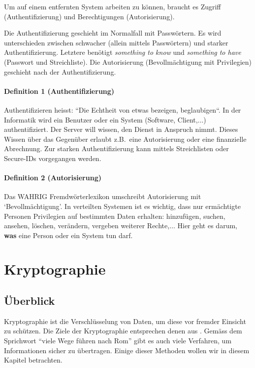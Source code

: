 Um auf einem entfernten System arbeiten zu können, braucht es Zugriff
(Authentifizierung) und Berechtigungen (Autorisierung).

Die Authentifizierung geschieht im Normalfall mit Passwörtern. Es wird
unterschieden zwischen schwacher (allein mittels Passwörtern) und
starker Authentifizierung. Letztere benötigt \emph{something to know}
und \emph{something to have} (Passwort und Streichliste). Die Autorisierung
(Bevollmächtigung mit Privilegien) geschieht nach der Authentifizierung.

\paragraph*{Definition 1 (Authentifizierung)}
Authentifizieren heisst: ``Die Echtheit von etwas bezeigen, beglaubigen``\cite{wahrig}.
In der Informatik wird ein Benutzer oder ein System (Software, Client,$\ldots$)
authentifiziert. Der Server will wissen, den Dienst in Anspruch nimmt. Dieses
Wissen über das Gegenüber erlaubt z.B.~eine Autorisierung oder eine finanzielle
Abrechnung. Zur starken Authentifizierung kann mittels Streichlisten oder
Secure-IDs vorgegangen werden.

\paragraph*{Definition 2 (Autorisierung)}
Das WAHRIG Fremdwörterlexikon umschreibt Autorisierung mit `Bevollmächtigung'.
In verteilten Systemen ist es wichtig, dass nur ermächtigte Personen Privilegien
auf bestimmten Daten erhalten: hinzufügen, suchen, ansehen, löschen, verändern,
vergeben weiterer Rechte,$\ldots$
Hier geht es darum, \textbf{was} eine Person oder ein System tun darf.

\section{Kryptographie}

\subsection{Überblick}

Kryptographie ist die Verschlüsselung von Daten, um diese vor fremder Einsicht
zu schützen. Die Ziele der Kryptographie entsprechen denen aus
.
Gemäss dem Sprichwort ``viele Wege führen nach Rom'' gibt es auch viele Verfahren,
um Informationen sicher zu übertragen. Einige dieser Methoden wollen wir in
diesem Kapitel betrachten.

